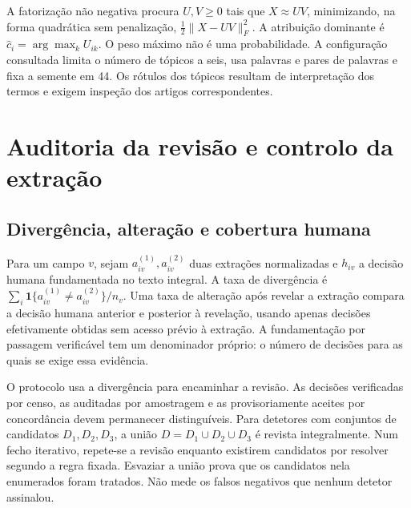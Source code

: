 A fatorização não negativa procura $U,V\geq0$ tais que $X\approx UV$, minimizando, na forma quadrática sem penalização, $\tfrac12\|X-UV\|_F^2$. A atribuição dominante é $\widehat c_i=\arg\max_kU_{ik}$. O peso máximo não é uma probabilidade. A configuração consultada limita o número de tópicos a seis, usa palavras e pares de palavras e fixa a semente em 44. Os rótulos dos tópicos resultam de interpretação dos termos e exigem inspeção dos artigos correspondentes.


\section{Auditoria da revisão e controlo da extração}
\label{sec:mat-auditoria-revisao}

\subsection{Divergência, alteração e cobertura humana}
\label{sec:mat-auditoria-taxas}
Para um campo $v$, sejam $a_{iv}^{(1)},a_{iv}^{(2)}$ duas extrações normalizadas e $h_{iv}$ a decisão humana fundamentada no texto integral. A taxa de divergência é $\sum_i\mathbf1\{a_{iv}^{(1)}\neq a_{iv}^{(2)}\}/n_v$. Uma taxa de alteração após revelar a extração compara a decisão humana anterior e posterior à revelação, usando apenas decisões efetivamente obtidas sem acesso prévio à extração. A fundamentação por passagem verificável tem um denominador próprio: o número de decisões para as quais se exige essa evidência.

O protocolo usa a divergência para encaminhar a revisão. As decisões verificadas por censo, as auditadas por amostragem e as provisoriamente aceites por concordância devem permanecer distinguíveis. Para detetores com conjuntos de candidatos $D_1,D_2,D_3$, a união $D=D_1\cup D_2\cup D_3$ é revista integralmente. Num fecho iterativo, repete-se a revisão enquanto existirem candidatos por resolver segundo a regra fixada. Esvaziar a união prova que os candidatos nela enumerados foram tratados. Não mede os falsos negativos que nenhum detetor assinalou.

